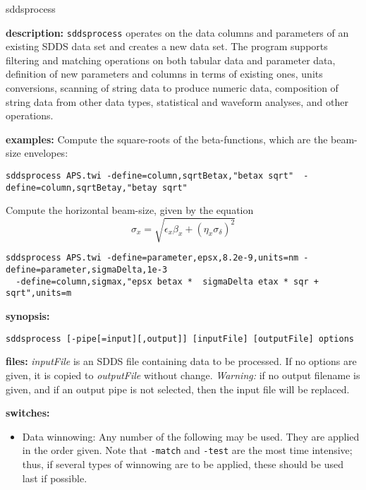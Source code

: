 \newpage
\begin{sddsprog}{sddsprocess}
  \item \textbf{description:}
  \verb|sddsprocess| operates on the data columns and parameters of an existing SDDS data set and creates a new
  data set.  The program supports filtering and matching operations on both tabular data and parameter
  data, definition of new parameters and columns in terms of existing ones, units conversions, scanning of
  string data to produce numeric data, composition of string data from other data types,
  statistical and waveform analyses, and other operations.
  \item \textbf{examples:}
  Compute the square-roots of the beta-functions, which are the beam-size envelopes:
\begin{verbatim}
sddsprocess APS.twi -define=column,sqrtBetax,"betax sqrt"  -define=column,sqrtBetay,"betay sqrt"
\end{verbatim}
  Compute the horizontal beam-size, given by the equation
  \[ \sigma_x = \sqrt{ \epsilon_x \beta_x + (\eta_x \sigma_\delta)^2} \]
\begin{verbatim}
sddsprocess APS.twi -define=parameter,epsx,8.2e-9,units=nm -define=parameter,sigmaDelta,1e-3
  -define=column,sigmax,"epsx betax *  sigmaDelta etax * sqr + sqrt",units=m
\end{verbatim}
  \item \textbf{synopsis:}
\begin{verbatim}
sddsprocess [-pipe[=input][,output]] [inputFile] [outputFile] options
\end{verbatim}
  \item \textbf{files:}
{\em inputFile} is an SDDS file containing data to be processed.  If no options are given, it is copied to {\em
outputFile} without change.  {\em Warning:} if no output filename is given, and if an output pipe is not selected,
then the input file will be replaced.

  \item \textbf{switches:}
    \begin{itemize}
    \item Data winnowing: Any number of the following may be used.  They are applied in the order
given.  Note that {\tt -match} and {\tt -test} are the most time intensive; thus, if several types
of winnowing are to be applied, these should be used last if possible.


\end{itemize}
\end{sddsprog}
